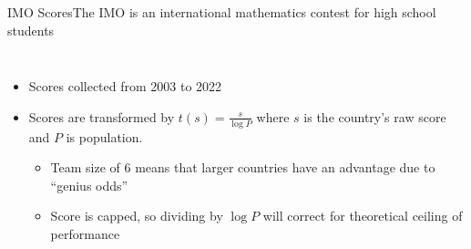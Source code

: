 \documentclass[10pt]{beamer}
\begin{document}
\begin{frame}{IMO Scores}{The IMO is an international mathematics contest for high school students
    }
    \begin{columns}
            \centering
            \begin{table}
            \caption{Top 10 countries by IMO score.}
        \end{table}
            \begin{itemize}
                \item Scores collected from 2003 to 2022
                \item Scores are transformed by $t(s) = \frac{s}{\log P}$ where $s$ is the country's raw score and $P$ is population.
                \begin{itemize}
                    \item Team size of 6 means that larger countries have an advantage due to ``genius odds''
                    \item Score is capped, so dividing by $\log P$ will correct for theoretical ceiling of performance
                \end{itemize}
            \end{itemize}
        \end{columns}
\end{frame}
\end{document}
